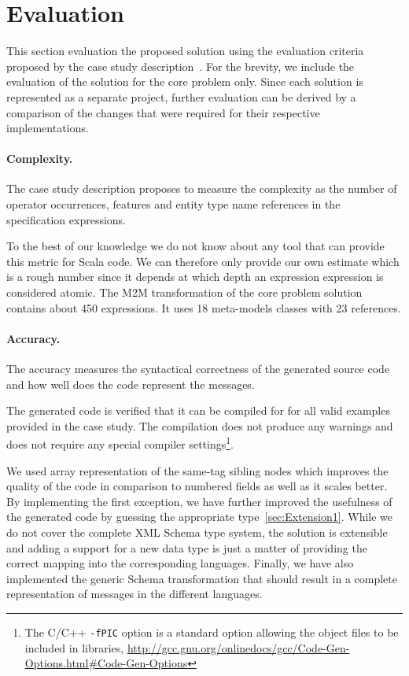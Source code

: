 
\section{Evaluation}
\label{sec:Evaluation}

This section evaluation the proposed solution using the evaluation criteria proposed by the case study description~\cite{Lano2014}.
For the brevity, we include the evaluation of the solution for the core problem only.
Since each solution is represented as a separate project, further evaluation can be derived by a comparison of the changes that were required for their respective implementations.


\paragraph{Complexity.}

The case study description proposes to measure the complexity as the number of operator occurrences, features and entity type name references in the specification expressions.

To the best of our knowledge we do not know about any tool that can provide this metric for Scala code.
We can therefore only provide our own estimate which is a rough number since it depends at which depth an expression expression is considered atomic.
The M2M transformation of the core problem solution contains about 450 expressions. It uses 18 meta-models classes with 23 references.

\paragraph{Accuracy.}
%
The accuracy measures the syntactical correctness of the generated source code and how well does the code represent the \FIXML messages.

The generated code is verified that it can be compiled for for all valid examples provided in the case study.
The compilation does not produce any warnings and does not require any special compiler settings\footnote{The C/C++ \texttt{-fPIC} option is a standard option allowing the object files to be included in libraries, \Cf \url{http://gcc.gnu.org/onlinedocs/gcc/Code-Gen-Options.html\#Code-Gen-Options}}.

We used array representation of the same-tag sibling nodes which improves the quality of the code in comparison to numbered fields as well as it scales better.
By implementing the first exception, we have further improved the usefulness of the generated code by guessing the appropriate type~\ref{sec:Extension1}.
While we do not cover the complete XML Schema type system, the solution is extensible and adding a support for a new data type is just a matter of providing the correct mapping into the corresponding languages.
Finally, we have also implemented the generic \FIXML Schema transformation that should result in a complete representation of \FIXML messages in the different languages.

